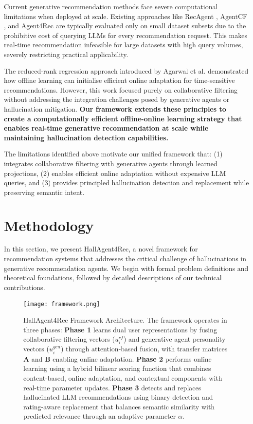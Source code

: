 \documentclass[acmsmall]{acmart}
\begin{document}
Current generative recommendation methods face severe computational limitations when deployed at scale. Existing approaches like RecAgent \cite{mitchell2024recagent}, AgentCF \cite{zhang2024agentcf}, and Agent4Rec \cite{zhang2024generative} are typically evaluated only on small dataset subsets due to the prohibitive cost of querying LLMs for every recommendation request. This makes real-time recommendation infeasible for large datasets with high query volumes, severely restricting practical applicability.

The reduced-rank regression approach introduced by Agarwal et al. \cite{agarwal2010fast} demonstrated how offline learning can initialise efficient online adaptation for time-sensitive recommendations. However, this work focused purely on collaborative filtering without addressing the integration challenges posed by generative agents or hallucination mitigation. \textbf{Our framework extends these principles to create a computationally efficient offline-online learning strategy that enables real-time generative recommendation at scale while maintaining hallucination detection capabilities.}

The limitations identified above motivate our unified framework that: (1) integrates collaborative filtering with generative agents through learned projections, (2) enables efficient online adaptation without expensive LLM queries, and (3) provides principled hallucination detection and replacement while preserving semantic intent.

\section{Methodology}

In this section, we present HallAgent4Rec, a novel framework for recommendation systems that addresses the critical challenge of hallucinations in generative recommendation agents. We begin with formal problem definitions and theoretical foundations, followed by detailed descriptions of our technical contributions.

\begin{figure}
    \centering
    \texttt{[image: framework.png]}
    \caption{HallAgent4Rec Framework Architecture. The framework operates in three phases: \textbf{Phase 1} learns dual user representations by fusing collaborative filtering vectors ($u^{cf}_i$) and generative agent personality vectors ($u^{gen}_i$) through attention-based fusion, with transfer matrices $\mathbf{A}$ and $\mathbf{B}$ enabling online adaptation. \textbf{Phase 2} performs online learning using a hybrid bilinear scoring function that combines content-based, online adaptation, and contextual components with real-time parameter updates. \textbf{Phase 3} detects and replaces hallucinated LLM recommendations using binary detection and rating-aware replacement that balances semantic similarity with predicted relevance through an adaptive parameter $\alpha$.}
    \label{fig:framework}
\end{figure}
\end{document}
